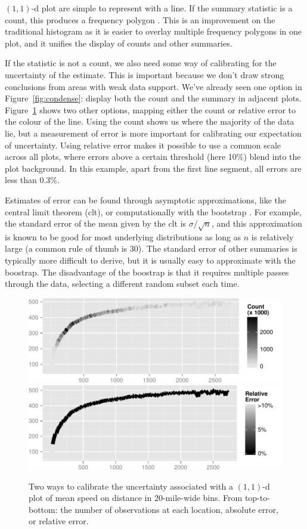 \documentclass[journal]{vgtc}                %
\begin{document}
$(1,1)$-d plot are simple to represent with a line. If the summary statistic is a count, this produces a frequency polygon \citep{scott:1985a}. This is an improvement on the traditional histogram as it is easier to overlay multiple frequency polygons in one plot, and it unifies the display of counts and other summaries. 

If the statistic is not a count, we also need some way of calibrating for the uncertainty of the estimate. This is important because we don't draw strong conclusions from areas with weak data support. We've already seen one option in Figure~\ref{fig:condense}: display both the count and the summary in adjacent plots. Figure~\ref{fig:1d-error} shows two other options, mapping either the count or relative error to the colour of the line. Using the count shows us where the majority of the data lie, but a measurement of error is more important for calibrating our expectation of uncertainty. Using relative error makes it possible to use a common scale across all plots, where errors above a certain threshold (here 10\%) blend into the plot background. In this example, apart from the first line segment, all errors are less than 0.3\%.

Estimates of error can be found through asymptotic approximations, like the central limit theorem ({\sc clt}), or computationally with the bootstrap \citep{efron:1983}. For example, the standard error of the mean given by the {\sc clt} is $\sigma / \sqrt{n}$, and this approximation is known to be good for most underlying distributions as long as $n$ is relatively large (a common rule of thumb is 30). The standard error of other summaries is typically more difficult to derive, but it is usually easy to approximate with the boostrap. The disadvantage of the boostrap is that it requires multiple passes through the data, selecting a different random subset each time.  

\begin{figure}
  \centering
   \includegraphics[width=\linewidth]{1d-count}
   \includegraphics[width=\linewidth]{1d-relerr}
 \caption{Two ways to calibrate the uncertainty associated with a $(1,1)$-d plot of mean speed on distance in 20-mile-wide bins. From top-to-bottom: the number of observations at each location, absolute error, or relative error.}
 \label{fig:1d-error}
\end{figure}
\end{document}
